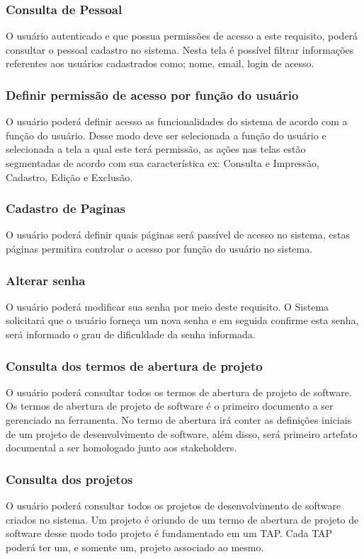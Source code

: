 \documentclass{acm_proc_article-sp}
\begin{document}
\subsubsection{Consulta de Pessoal}
O usuário autenticado e que possua permissões de acesso a este requisito, poderá consultar o pessoal cadastro no sistema. Nesta tela é possível filtrar informações referentes aos usuários cadastrados como; nome, email, login de acesso.   

\subsubsection{Definir permissão de acesso por função do usuário}
O usuário poderá definir acesso as funcionalidades do sistema de acordo com a função do usuário. Desse modo deve ser selecionada a função do usuário e selecionada a tela a qual este terá permissão, as ações nas telas estão segmentadas de acordo com sua característica ex: Consulta e Impressão, Cadastro, Edição e Exclusão. 

\subsubsection{Cadastro de Paginas}
O usuário poderá definir quais páginas será passível de acesso no sistema, estas páginas permitira controlar o acesso por função do usuário no sistema.

\subsubsection{Alterar senha}
O usuário poderá modificar sua senha por meio deste requisito. O Sistema solicitará que o usuário forneça um nova senha e em seguida confirme esta senha, será informado o grau de dificuldade da senha informada.

\subsubsection{Consulta dos termos de abertura de projeto}
O usuário poderá consultar todos os termos de abertura de projeto de software. Os termos de abertura de projeto de software é o primeiro documento a ser gerenciado na ferramenta. No termo de abertura irá conter as definições iniciais de um projeto de desenvolvimento de software, além disso, será primeiro artefato documental a ser homologado junto aos stakeholders.

\subsubsection{Consulta dos projetos}
O usuário poderá consultar todos os projetos de desenvolvimento de software criados no sistema. Um projeto é oriundo de um termo de abertura de projeto de software desse modo todo projeto é fundamentado em um TAP. Cada TAP poderá ter um, e somente um, projeto associado ao mesmo.
\end{document}
